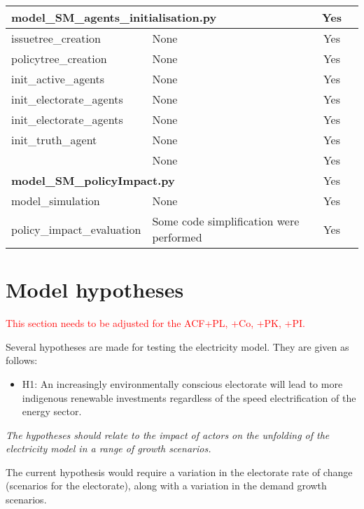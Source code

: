 \documentclass[12pt]{article}
\begin{document}
\begin{longtable}{|l|p{6cm}|c|c|}
\multicolumn{2}{|l|}{{\bfseries model\_SM\_agents\_initialisation.py}}
									& Yes	\\ \hline
issuetree\_creation			& None		& Yes	\\ \hline
policytree\_creation			& None		& Yes	\\ \hline
init\_active\_agents			& None		& Yes	\\ \hline
init\_electorate\_agents		& None		& Yes	\\ \hline
init\_electorate\_agents		& None		& Yes	\\ \hline
init\_truth\_agent			& None		& Yes	\\ \hline
						& None		& Yes	\\ \hline
\multicolumn{2}{|l|}{{\bfseries model\_SM\_policyImpact.py}}
									& Yes	\\ \hline
model\_simulation			& None		& Yes	\\ \hline
policy\_impact\_evaluation	& Some code simplification were performed
									& Yes	\\ \hline
	
\end{longtable}


\section{Model hypotheses}
\label{sec:hypotheses}

\textcolor{red}{This section needs to be adjusted for the ACF+PL, +Co, +PK, +PI.}

Several hypotheses are made for testing the electricity model. They are given as follows:

\begin{itemize}
\item H1: An increasingly environmentally conscious electorate will lead to more indigenous renewable investments regardless of the speed electrification of the energy sector.
\end{itemize}


\emph{The hypotheses should relate to the impact of actors on the unfolding of the electricity model in a range of growth scenarios.}

The current hypothesis would require a variation in the electorate rate of change (scenarios for the electorate), along with a variation in the demand growth scenarios.
\end{document}
